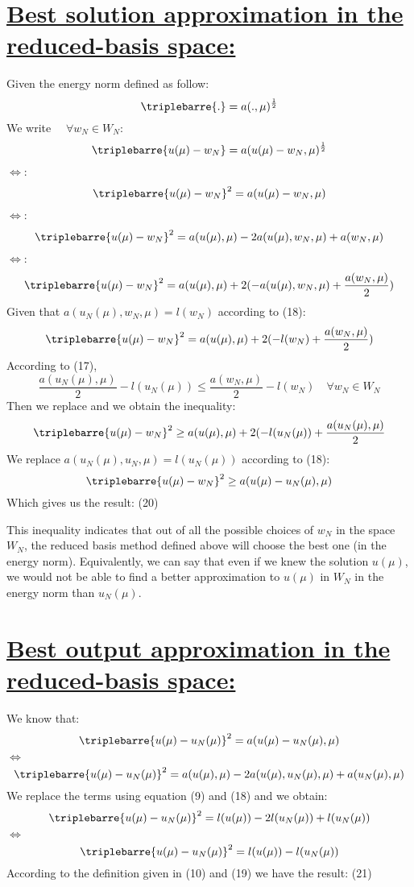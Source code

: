 \section[Question a: Best solution approximation in the reduced-basis space]{\uline{Best solution approximation in the reduced-basis space:}}
Given the energy norm defined as follow:
$$\triplebarre{.} = a(.,\mu)^{\frac 1 2}$$
We write $\quad \forall w_N \in W_N$:
$$\triplebarre{u(\mu)-w_N} = a(u(\mu)-w_N,\mu)^{\frac 1 2}$$
$\iff$:
$$\triplebarre{u(\mu)-w_N}^2 = a(u(\mu)-w_N,\mu)$$
$\iff$:
$$\triplebarre{u(\mu)-w_N}^2 = a(u(\mu),\mu)-2a(u(\mu),w_N,\mu)+a(w_N,\mu)$$
$\iff$:
$$\triplebarre{u(\mu)-w_N}^2 = a(u(\mu),\mu)+ 2(-a(u(\mu),w_N,\mu)+\frac {a(w_N,\mu)}{2})$$
Given that $a(u_N(\mu),w_N,\mu) = l(w_N)$ according to (18):
$$\triplebarre{u(\mu)-w_N}^2 = a(u(\mu),\mu)+ 2(-l(w_N)+\frac {a(w_N,\mu)}{2})$$
According to (17), 
$$\frac {a(u_N(\mu),\mu)}{2}-l(u_N(\mu)) \leq \frac {a(w_N,\mu)}{2}-l(w_N) \quad \forall w_N \in W_N $$
Then we replace and we obtain the inequality:
$$\triplebarre{u(\mu)-w_N}^2 \geq a(u(\mu),\mu)+ 2(-l(u_N(\mu))+\frac {a(u_N(\mu),\mu)}{2}$$
We replace $a(u_N(\mu),u_N,\mu) = l(u_N(\mu))$ according to (18):
$$\triplebarre{u(\mu)-w_N}^2 \geq a(u(\mu)-u_N(\mu),\mu)$$
Which gives us the result:
 {(20)}

This inequality indicates that out of all the possible choices of $w_N$ in the space $W_N$, the reduced basis method defined above will choose the best one (in the energy norm). Equivalently, we can say that even if we knew the solution $u(\mu)$, we would not be able to find a better approximation to $u(\mu)$ in $W_N$ in the energy norm than $u_N (\mu)$.

\section[Question b: Best output approximation in the reduced-basis space]{\uline{Best output approximation in the reduced-basis space:}}

We know that:
$$\triplebarre{u(\mu)-u_N(\mu)}^2 = a(u(\mu)-u_N(\mu),\mu)$$
$\iff$
$$\triplebarre{u(\mu)-u_N(\mu)}^2 = a(u(\mu),\mu) -2 a(u(\mu),u_N(\mu),\mu)+ a(u_N(\mu),\mu)$$
We replace the terms using equation (9) and (18) and we obtain:
$$\triplebarre{u(\mu)-u_N(\mu)}^2 = l(u(\mu)) -2 l(u_N(\mu))+ l(u_N(\mu))$$
$\iff$
$$\triplebarre{u(\mu)-u_N(\mu)}^2 = l(u(\mu)) - l(u_N(\mu))$$
According to the definition given in (10) and (19) we have the result:
 {(21)}


